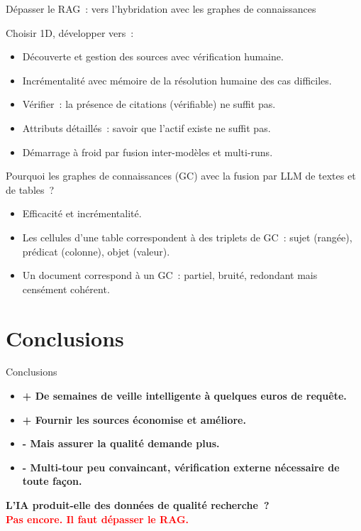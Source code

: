 \documentclass[aspectratio=169]{beamer}
\begin{document}
\begin{frame}{Dépasser le RAG~: vers l'hybridation avec les graphes de connaissances}

Choisir 1D, développer vers~:

\begin{itemize}
  \item Découverte et gestion des sources avec vérification humaine.
  \item Incrémentalité avec mémoire de la résolution humaine des cas difficiles.
  \item Vérifier~: la présence de citations (vérifiable) ne suffit pas.
  \item Attributs détaillés~: savoir que l'actif existe ne suffit pas.
  \item Démarrage à froid par fusion inter-modèles et multi-runs.
\end{itemize}

Pourquoi les graphes de connaissances (GC) avec la fusion par LLM de textes et de tables~?
\begin{itemize}
  \item Efficacité et incrémentalité.
  \item Les cellules d'une table correspondent à des triplets de GC~: sujet (rangée), prédicat (colonne), objet (valeur).
  \item Un document correspond à un GC~: partiel, bruité, redondant mais censément cohérent.
\end{itemize}

\end{frame}


\section{Conclusions}

\begin{frame}{Conclusions}
\begin{itemize}\setlength\itemsep{1.2em}
  \item \textbf{+ De semaines de veille intelligente à quelques euros de requête.}
  \item \textbf{+ Fournir les sources économise et améliore.}\\
  \item \textbf{- Mais assurer la qualité demande plus.}\\
  \item \textbf{- Multi-tour peu convaincant, vérification externe nécessaire de toute façon.}\\
\end{itemize}

\bigskip
\begin{center}
\textbf{L'IA produit-elle des données de qualité recherche~?}\\
\Large\textcolor{red}{\textbf{Pas encore. Il faut dépasser le RAG.}}
\end{center}
\end{frame}
\end{document}
